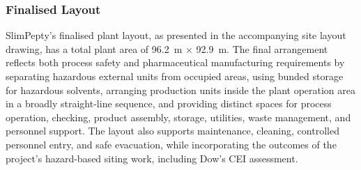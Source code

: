 \subsubsection{Finalised Layout}

SlimPepty's finalised plant layout, as presented in the accompanying site layout drawing, has a total plant area of 96.2~m $\times$ 92.9~m. The final arrangement reflects both process safety and pharmaceutical manufacturing requirements by separating hazardous external units from occupied areas, using bunded storage for hazardous solvents, arranging production units inside the plant operation area in a broadly straight-line sequence, and providing distinct spaces for process operation, checking, product assembly, storage, utilities, waste management, and personnel support. The layout also supports maintenance, cleaning, controlled personnel entry, and safe evacuation, while incorporating the outcomes of the project's hazard-based siting work, including Dow's CEI assessment.
